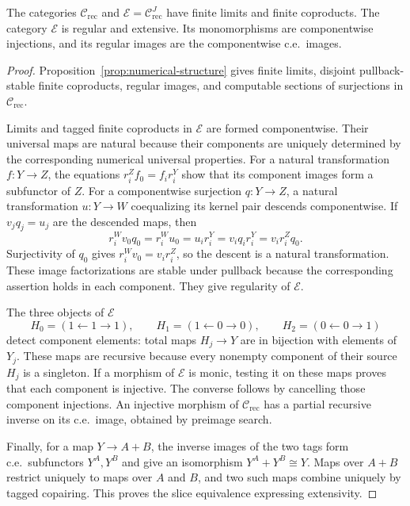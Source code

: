 \begin{proposition}\label{prop:fork-total}
The categories $\mathcal C_{\mathrm{rec}}$ and
$\mathcal E=\mathcal C_{\mathrm{rec}}^J$ have finite limits and
finite coproducts. The category $\mathcal E$ is regular and
extensive. Its monomorphisms are componentwise injections, and its
regular images are the componentwise c.e.\ images.
\end{proposition}
\begin{proof}
Proposition~\ref{prop:numerical-structure} gives finite limits,
disjoint pullback-stable finite coproducts, regular images, and
computable sections of surjections in $\mathcal C_{\mathrm{rec}}$.

Limits and tagged finite coproducts in $\mathcal E$ are formed
componentwise. Their universal maps are natural because their
components are uniquely determined by the corresponding numerical
universal properties. For a natural transformation $f:Y\to Z$,
the equations $r_i^Zf_0=f_i r_i^Y$ show that its component images
form a subfunctor of $Z$.
For a componentwise surjection $q:Y\to Z$, a natural transformation
$u:Y\to W$ coequalizing its kernel pair descends componentwise.
If $v_jq_j=u_j$ are the descended maps, then
\[
 r_i^Wv_0q_0=r_i^Wu_0=u_i r_i^Y
 =v_iq_i r_i^Y=v_i r_i^Zq_0.
\]
Surjectivity of $q_0$ gives $r_i^Wv_0=v_i r_i^Z$, so the
descent is a natural transformation. These image factorizations are stable
under pullback because the corresponding assertion holds in
each component. They give regularity of $\mathcal E$.

The three objects of $\mathcal E$
\[
 H_0=(1\leftarrow1\to1),\qquad
 H_1=(1\leftarrow0\to0),\qquad
 H_2=(0\leftarrow0\to1)
\]
detect component elements: total maps $H_j\to Y$ are in bijection
with elements of $Y_j$. These maps are recursive because every
nonempty component of their source $H_j$ is a singleton.
If a morphism of $\mathcal E$ is monic,
testing it on these maps proves that each component is injective.
The converse follows by cancelling those component injections.
An injective morphism of $\mathcal C_{\mathrm{rec}}$ has a partial recursive inverse
on its c.e.\ image, obtained by preimage search.

Finally, for a map $Y\to A+B$, the inverse images of the two
tags form c.e.\ subfunctors $Y^A,Y^B$ and give an isomorphism
$Y^A+Y^B\cong Y$. Maps over $A+B$ restrict uniquely to maps
over $A$ and $B$, and two such maps combine uniquely by tagged
copairing. This proves the slice equivalence expressing extensivity.
\end{proof}

